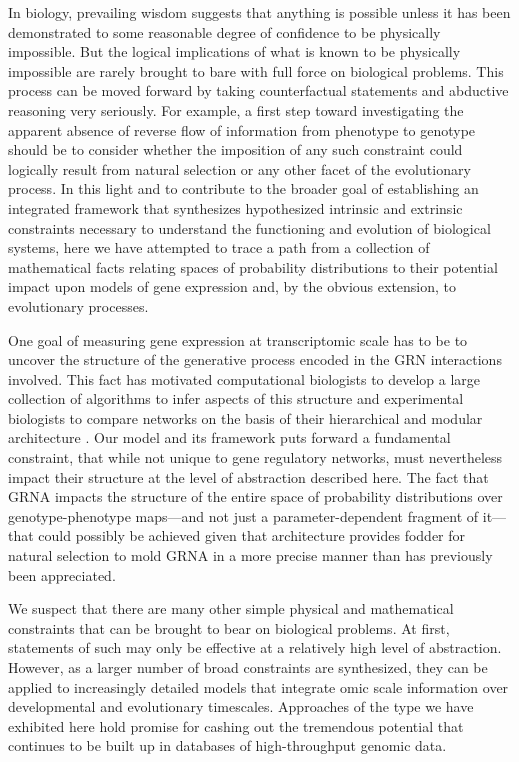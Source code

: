 In biology, prevailing wisdom suggests that anything is possible unless it has been demonstrated to some reasonable degree of confidence to be physically impossible. But the logical implications of what is known to be physically impossible are rarely brought to bare with full force on biological problems. This process can be moved forward by taking counterfactual statements and abductive reasoning very seriously. For example, a first step toward investigating the apparent absence of reverse flow of information from phenotype to genotype should be to consider whether the imposition of any such constraint could logically result from natural selection or any other facet of the evolutionary process. In this light and to contribute to the broader goal of establishing an integrated framework that synthesizes hypothesized intrinsic and extrinsic constraints necessary to understand the functioning and evolution of biological systems, here we have attempted to trace a path from a collection of mathematical facts relating spaces of probability distributions to their potential impact upon models of gene expression and, by the obvious extension, to evolutionary processes.

One goal of measuring gene expression at transcriptomic scale has to be to uncover the structure of the generative process encoded in the GRN interactions involved. This fact has motivated computational biologists to develop a large collection of algorithms to infer aspects of this structure \cite{DeSmet2010} and experimental biologists to compare networks on the basis of their hierarchical and modular architecture \cite{Ideker2012}. Our model and its framework puts forward a fundamental constraint, that while not unique to gene regulatory networks, must nevertheless impact their structure at the level of abstraction described here. The fact that GRNA impacts the structure of the entire space of probability distributions over genotype-phenotype maps---and not just a parameter-dependent fragment of it---that could possibly be achieved given that architecture provides fodder for natural selection to mold GRNA in a more precise manner than has previously been appreciated.

We suspect that there are many other simple physical and mathematical constraints that can be brought to bear on biological problems. At first, statements of such may only be effective at a relatively high level of abstraction. However, as a larger number of broad constraints are synthesized, they can be applied to increasingly detailed models that integrate omic scale information over developmental and evolutionary timescales. Approaches of the type we have exhibited here hold promise for cashing out the tremendous potential that continues to be built up in databases of high-throughput genomic data.
